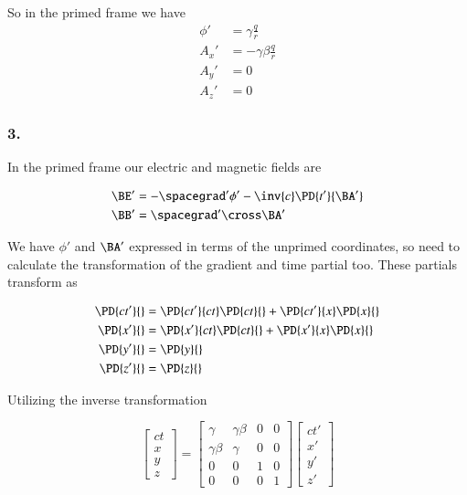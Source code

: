 So in the primed frame we have
\begin{align}\label{eqn:relElectroDynProblemSet2:970}
\phi' &= \gamma \frac{q}{r} \\
A_x' &= -\gamma \beta \frac{q}{r} \\
A_y' &= 0 \\
A_z' &= 0 
\end{align}

\subsubsection{3.}

In the primed frame our electric and magnetic fields are

\begin{align}\label{eqn:relElectroDynProblemSet2:990}
\BE' &= - \spacegrad' \phi' - \inv{c} \PD{t'}{\BA'} \\
\BB' &= \spacegrad' \cross \BA'
\end{align}

We have $\phi'$ and $\BA'$ expressed in terms of the unprimed coordinates, so need to calculate the transformation of the gradient and time partial too.  These partials transform as

\begin{align}\label{eqn:relElectroDynProblemSet2:1010}
\PD{c t'}{} &= \PD{ct'}{ct} \PD{ct}{} + \PD{ct'}{x} \PD{x}{} \\
\PD{x'}{} &= \PD{x'}{ct} \PD{ct}{} + \PD{x'}{x} \PD{x}{} \\
\PD{y'}{} &= \PD{y}{} \\
\PD{z'}{} &= \PD{z}{}
\end{align}

Utilizing the inverse transformation 

\begin{equation}\label{eqn:relElectroDynProblemSet2:1030}
\begin{bmatrix}
ct \\
x \\
y \\
z
\end{bmatrix}
=
\begin{bmatrix}
\gamma & \gamma \beta & 0 & 0 \\
\gamma \beta & \gamma & 0 & 0 \\
0 & 0 & 1 & 0 \\
0 & 0 & 0 & 1 
\end{bmatrix}
\begin{bmatrix}
ct' \\
x' \\
y' \\
z'
\end{bmatrix}
\end{equation}

